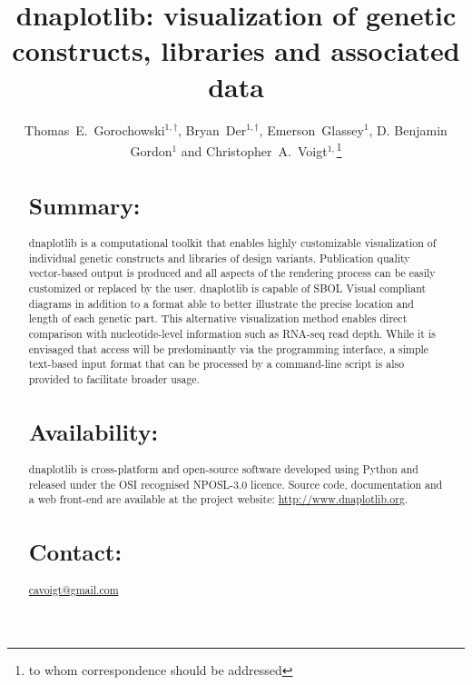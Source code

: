 \documentclass{bioinfo}
\begin{document}

\title[dnaplotlib]{dnaplotlib: visualization of genetic constructs, libraries and associated data}
\author[Thomas E. Gorochowski \textit{et~al.}]{Thomas~E.~Gorochowski$^{1,\dagger}$, Bryan~Der$^{1,\dagger}$, Emerson~Glassey$^{1}$, D. Benjamin Gordon$^{1}$ and Christopher~A.~Voigt$^{1,}$\footnote{to whom correspondence should be addressed}}
\address{$^{1}$Department of Biological Engineering, Synthetic Biology Center, Massachusetts Institute of Technology, USA.\\
$^{\dagger}$ \small These authors contributed equally to this work.}




\maketitle

\begin{abstract}

\section{Summary:}
dnaplotlib is a computational toolkit that enables highly customizable visualization of individual genetic constructs and libraries of design variants. Publication quality vector-based output is produced and all aspects of the rendering process can be easily customized or replaced by the user. dnaplotlib is capable of SBOL Visual compliant diagrams in addition to a format able to better illustrate the precise location and length of each genetic part. This alternative visualization method enables direct comparison with nucleotide-level information such as RNA-seq read depth. While it is envisaged that access will be predominantly via the programming interface, a simple text-based input format that can be processed by a command-line script is also provided to facilitate broader usage.

\section{Availability:}
dnaplotlib is cross-platform and open-source software developed using Python and released under the OSI recognised NPOSL-3.0 licence. Source code, documentation and a web front-end are available at the project website: \href{http://www.dnaplotlib.org}{http://www.dnaplotlib.org}.

\section{Contact:} \href{cavoigt@gmail.com}{cavoigt@gmail.com}
\end{abstract}
\end{document}
